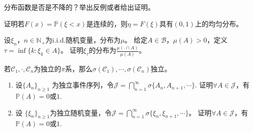 \documentclass{ctexart}
\newif\ifpreface
\begin{document}
\large
\setlength{\baselineskip}{1.2em}
\ifpreface

\newgeometry{left=2cm,right=2cm,top=2cm,bottom=2cm}
\else
{}
\maketitle
\fi
\begin{problem}\label{pro:5}
  分布函数是否是不降的？举出反例或者给出证明。
\end{problem}

\begin{problem}\label{pro:7}
  证明若\(F(x)=\mathbb{P}(\xi < x) \)是连续的，则\(\eta = F(\xi) \)具有\((0,1) \)上的均匀分布。
\end{problem}

\begin{problem}\label{pro:9}
  设\(\xi_n，n \in \mathbb{N}_{+} \)为\(\mathrm{i.i.d.}  \)随机变量，分布为\(\mu \)。
  给定\(A \in \mathcal{B} \)，\(\mu(A) >0 \)，定义\(\tau = \inf\{k:\xi_k \in A\} \)。
  证明\(\xi_{\tau} \)的分布为\(\frac{\mu(\cdot \cap A)}{\mu(A)} \)。
\end{problem}
\begin{problem}\label{pro:11}
  若\(\mathcal{C}_1,\cdot,\mathcal{C}_n \)为独立的\(\pi \)系，那么\(\sigma(\mathcal{C}_1),\cdots,\sigma(\mathcal{C}_n)\)独立。
\end{problem}
\begin{problem}\label{pro:12}
  \begin{enumerate}
    \item 设\(\{A_n\}_{n \geq 1} \) 为独立事件序列，令\(\mathcal{J} = \bigcap_{n=1}^{\infty} \sigma\{A_n,A_{n + 1},\cdots\}. \)
      证明\(\forall A \in \mathcal{J} \)，有\(\mathbb{P} (A) =0 \)或\(1 \).
    \item 设 \(\{\xi_n\}_{n \geq 1} \)为独立随机变量，令\(\mathcal{J} = \bigcap_{n=1}^{\infty} \sigma\{\xi_n,\xi_{n + 1},\cdots\} \)。
      证明\(\forall A \in \mathcal{J} \)，有\(\mathbb{P}(A)=0 \)或\(1 \).
  \end{enumerate}
\end{problem}
\end{document}
